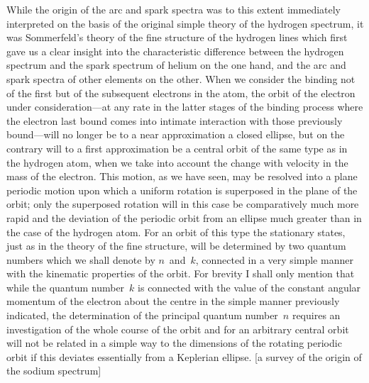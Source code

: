  While the origin of the arc and spark spectra
was to this extent immediately interpreted on the basis of the
original simple theory of the hydrogen spectrum, it was Sommerfeld's
theory of the fine structure of the hydrogen lines which first gave
us a clear insight into the characteristic difference between the
hydrogen spectrum and the spark spectrum of helium on the one
hand, and the arc and spark spectra of other elements on the other.
When we consider the binding not of the first but of the subsequent
electrons in the atom, the orbit of the electron under consideration---at
any rate in the latter stages of the binding process where the
electron last bound comes into intimate interaction with those
previously bound---will no longer be to a near approximation a
closed ellipse, but on the contrary will to a first approximation be a
central orbit of the same type as in the hydrogen atom, when we
take into account the change with velocity in the mass of the
electron. This motion, as we have seen, may be resolved into a
plane periodic motion upon which a uniform rotation is superposed
in the plane of the orbit; only the superposed rotation will in this
case be comparatively much more rapid and the deviation of the
periodic orbit from an ellipse much greater than in the case of the
hydrogen atom. For an orbit of this type the stationary states, just
as in the theory of the fine structure, will be determined by two
quantum numbers which we shall denote by $n$~and~$k$, connected in
a very simple manner with the kinematic properties of the orbit.
For brevity I shall only mention that while the quantum number~$k$
is connected with the value of the constant angular momentum
of the electron about the centre in the simple manner previously
indicated, the determination of the principal quantum number~$n$
requires an investigation of the whole course of the orbit and for
an arbitrary central orbit will not be related in a simple way to
the dimensions of the rotating periodic orbit if this deviates essentially
from a Keplerian ellipse.
[a survey of the origin of the sodium spectrum]

